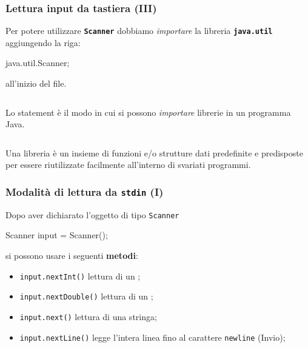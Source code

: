 \begin{frame}[fragile]\frametitle{Lettura input da tastiera (III)}
  
  Per potere utilizzare \texttt{\textbf{Scanner}} dobbiamo \emph{importare}
  la libreria \texttt{\textbf{java.util}} aggiungendo la riga:
  \begin{JavaCodePlain}[commandchars=\\!|]
  \Jimport java.util.Scanner;
  \end{JavaCodePlain}
  all'inizio del file.
  
  ${}$

  Lo statement  è il modo in cui si possono \emph{importare} librerie in
  un programma Java.

  ${}$

  Una libreria è un insieme di funzioni e/o strutture dati predefinite e predisposte
  per essere riutilizzate facilmente all'interno di svariati programmi.

\end{frame}

\begin{frame}[fragile]\frametitle{Modalità di lettura da \texttt{stdin} (I)}

  Dopo aver dichiarato l'oggetto di tipo \texttt{Scanner}
  \begin{JavaCodePlain}[commandchars=\\!|]
  Scanner input = \Jnew Scanner(\JsystemIn);
  \end{JavaCodePlain}

  si possono usare i seguenti \textbf{metodi}:
  \begin{itemize}
   \item \texttt{input.nextInt()} \structure{$\Rightarrow$} lettura di un \Jint;
   \item \texttt{input.nextDouble()} \structure{$\Rightarrow$} lettura di un \Jdouble;
   \item \texttt{input.next()} \structure{$\Rightarrow$} lettura di una stringa;
   \item \texttt{input.nextLine()} \structure{$\Rightarrow$} legge l'intera linea fino al
	 carattere \texttt{newline} (Invio);
  \end{itemize}

\end{frame}

